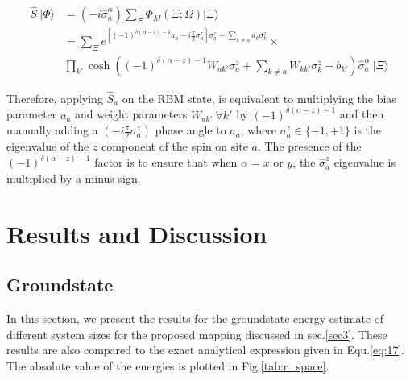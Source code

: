 \documentclass{article}
\begin{document}
\begin{equation}\label{eq:29_1}
	\begin{aligned}
		\hat{S}~|\Phi\rangle &= (-i\hat{\sigma}^{\alpha}_a)\sum_{\Xi}\Phi_{M}(\Xi;\Omega)|\Xi\rangle\\
		&= \sum_{\Xi} e^{[(-1)^{\delta(\alpha-z)-1} a_a -i\frac{\pi}{2}\sigma^{z}_a]\sigma^{z}_a + \sum_{k\neq a} a_k \sigma_k^z} \times \\ &\prod_{k'} \cosh \left((-1)^{\delta(\alpha-z)-1} W_{ak'} \sigma_a^z + \sum_{k\neq a} W_{kk'} \sigma_k^z + b_{k'} \right) \hat{\sigma}^{\alpha}_a~|\Xi\rangle
	\end{aligned}
\end{equation}

 Therefore, applying $\hat{S}_a$ on the RBM state, is equivalent to multiplying the bias parameter $a_a$ and weight parameters $W_{ak'}~\forall k'$ by $(-1)^{\delta(\alpha-z)-1}$ and then manually adding a $(-i\frac{\pi}{2}\sigma^{z}_a)$ phase angle to $a_a$, where $\sigma^{z}_a \in \{-1,+1\}$ is the eigenvalue of the $z$ component of the spin on site $a$. The presence of the $(-1)^{\delta(\alpha-z)-1}$ factor is to ensure that when $\alpha=x$ or $y$, the $\hat{\sigma}_a^{z}$ eigenvalue is multiplied by a minus sign. 


\section{Results and Discussion}\label{sec5}


\subsection{Groundstate}

In this section, we present the results for the groundstate energy estimate of different system sizes for the proposed mapping discussed in sec.\hspace{0.2mm}\ref{sec3}. These results are also compared to the exact analytical expression given in Equ.\hspace{0.2mm}\ref{eq:17}. The absolute value of the energies is plotted in Fig.\hspace{0.2mm}\ref{tab:r_space}. 
\end{document}
